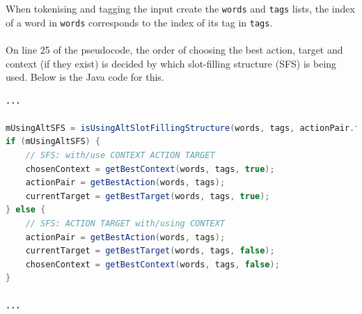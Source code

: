 \documentclass[12pt]{article}
\begin{document}
When tokenising and tagging the input create the \texttt{words} and \texttt{tags} lists, the index of a word in \texttt{words} corresponds to the index of its tag in \texttt{tags}.
\\
\\
On line 25 of the pseudocode, the order of choosing the best action, target and context (if they exist) is decided by which slot-filling structure (SFS) is being used. Below is the Java code for this.
\\
\begin{lstlisting}[language=Java, label={lst:sfs}]
...

mUsingAltSFS = isUsingAltSlotFillingStructure(words, tags, actionPair.first);
if (mUsingAltSFS) {
    // SFS: with/use CONTEXT ACTION TARGET
    chosenContext = getBestContext(words, tags, true);
    actionPair = getBestAction(words, tags);
    currentTarget = getBestTarget(words, tags, true);
} else {
    // SFS: ACTION TARGET with/using CONTEXT
    actionPair = getBestAction(words, tags);
    currentTarget = getBestTarget(words, tags, false);
    chosenContext = getBestContext(words, tags, false);
}

...
\end{lstlisting}
\end{document}
